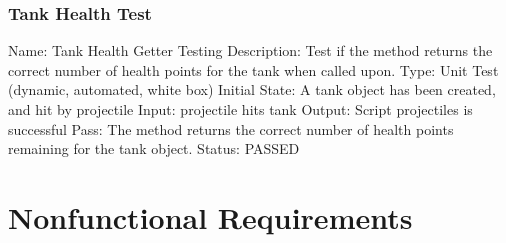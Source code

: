 \documentclass{article}
\begin{document}
\subsubsection{Tank Health Test}
\label{sec:3.2.16}
Name: Tank Health Getter Testing\newline
Description: Test if the method returns the correct number of health points 
for the tank when called upon.\newline
Type: Unit Test (dynamic, automated, white box)\newline
Initial State: A tank object has been created, and hit by projectile\newline
Input: projectile hits tank\newline
Output: Script projectiles is successful  \newline
Pass: The method returns the correct number of health points remaining for the 
tank object.\newline
\newline Status: PASSED




\section{Nonfunctional Requirements}
\end{document}
